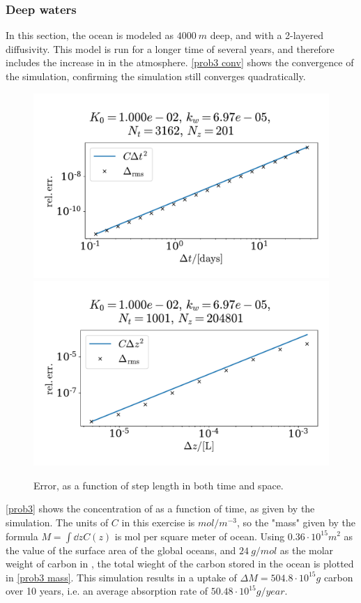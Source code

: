 \documentclass{article}
\begin{document}
    \subsubsection*{Deep waters}
    In this section, the ocean is modeled as $\SI{4000}{m}$ deep, and with a 2-layered diffusivity. This model is run for a longer time of several years, and therefore includes the increase in  in the atmosphere. \autoref{prob3 conv} shows the convergence of the simulation, confirming the simulation still converges quadratically.  

    \begin{figure}[h]
        \centering
        \includegraphics[width=.49\textwidth]{../plots/prob3_conv_test_t}
        \includegraphics[width=.49\textwidth]{../plots/prob3_conv_test_z}
        \caption{Error, as a function of step length in both time and space.}
        \label{prob3 conv}
    \end{figure}

    \autoref{prob3} shows the concentration of  as a function of time, as given by the simulation. The units of $C$ in this exercise is $\si{mol / m^{-3}}$, so the "mass" given by the formula $M = \int \dd z C(z)$ is mol per square meter of ocean. Using $0.36 \cdot 10^{15}\si{m^2}$ as the value of the surface area of the global oceans, and $\SI{24}{g / mol}$ as the molar weight of carbon in , the total wieght of the carbon stored in the ocean is plotted in \autoref{prob3 mass}. This simulation results in a uptake of $\Delta M = 504.8 \cdot 10^{15} \si{g}$ carbon over 10 years, i.e. an average absorption rate of $50.48 \cdot 10^{15} \si{g/year}$.
\end{document}
